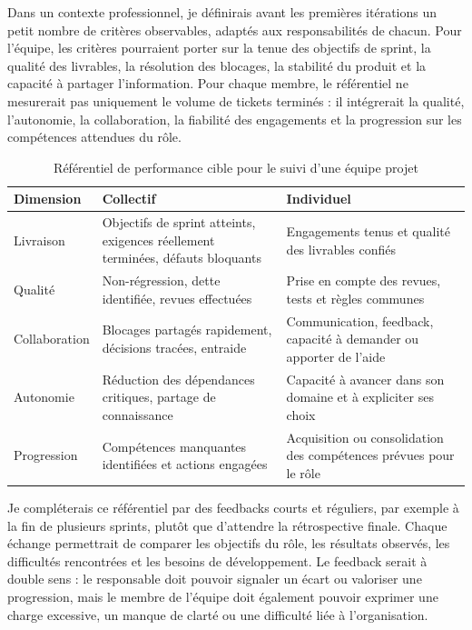 Dans un contexte professionnel, je définirais avant les premières itérations un petit nombre de critères observables, adaptés aux responsabilités de chacun. Pour l'équipe, les critères pourraient porter sur la tenue des objectifs de sprint, la qualité des livrables, la résolution des blocages, la stabilité du produit et la capacité à partager l'information. Pour chaque membre, le référentiel ne mesurerait pas uniquement le volume de tickets terminés : il intégrerait la qualité, l'autonomie, la collaboration, la fiabilité des engagements et la progression sur les compétences attendues du rôle.

\begin{table}[H]
\centering
\small
\begin{tabular}{p{3.2cm} p{5.2cm} p{5.2cm}}
\toprule
\textbf{Dimension} & \textbf{Collectif} & \textbf{Individuel} \\
\midrule
Livraison & Objectifs de sprint atteints, exigences réellement terminées, défauts bloquants & Engagements tenus et qualité des livrables confiés \\
Qualité & Non-régression, dette identifiée, revues effectuées & Prise en compte des revues, tests et règles communes \\
Collaboration & Blocages partagés rapidement, décisions tracées, entraide & Communication, feedback, capacité à demander ou apporter de l'aide \\
Autonomie & Réduction des dépendances critiques, partage de connaissance & Capacité à avancer dans son domaine et à expliciter ses choix \\
Progression & Compétences manquantes identifiées et actions engagées & Acquisition ou consolidation des compétences prévues pour le rôle \\
\bottomrule
\end{tabular}
\caption{Référentiel de performance cible pour le suivi d'une équipe projet}
\label{tab:lynx-referentiel-performance-cible}
\end{table}

Je compléterais ce référentiel par des feedbacks courts et réguliers, par exemple à la fin de plusieurs sprints, plutôt que d'attendre la rétrospective finale. Chaque échange permettrait de comparer les objectifs du rôle, les résultats observés, les difficultés rencontrées et les besoins de développement. Le feedback serait à double sens : le responsable doit pouvoir signaler un écart ou valoriser une progression, mais le membre de l'équipe doit également pouvoir exprimer une charge excessive, un manque de clarté ou une difficulté liée à l'organisation.

